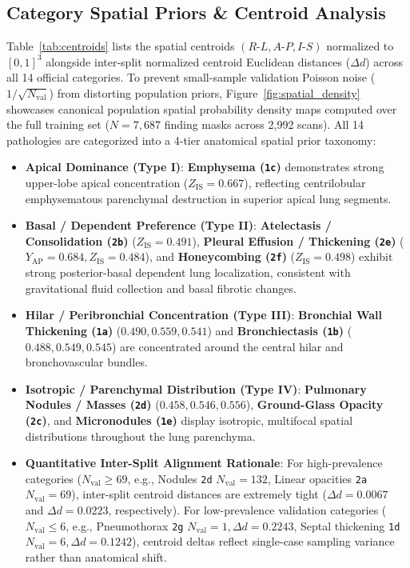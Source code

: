 \documentclass[11pt,a4paper]{article}
\begin{document}
\subsection{Category Spatial Priors \& Centroid Analysis}
Table~\ref{tab:centroids} lists the spatial centroids $(R\text{-}L, A\text{-}P, I\text{-}S)$ normalized to $[0, 1]^3$ alongside inter-split normalized centroid Euclidean distances ($\Delta d$) across all 14 official categories. To prevent small-sample validation Poisson noise ($1/\sqrt{N_{\text{val}}}$) from distorting population priors, Figure~\ref{fig:spatial_density} showcases canonical population spatial probability density maps computed over the full training set ($N=7,687$ finding masks across 2,992 scans). All 14 pathologies are categorized into a 4-tier anatomical spatial prior taxonomy:
\begin{itemize}
    \item \textbf{Apical Dominance (Type I)}: \textbf{Emphysema (\texttt{1c})} demonstrates strong upper-lobe apical concentration ($Z_{\text{IS}} = 0.667$), reflecting centrilobular emphysematous parenchymal destruction in superior apical lung segments.
    \item \textbf{Basal / Dependent Preference (Type II)}: \textbf{Atelectasis / Consolidation (\texttt{2b})} ($Z_{\text{IS}} = 0.491$), \textbf{Pleural Effusion / Thickening (\texttt{2e})} ($Y_{\text{AP}} = 0.684, Z_{\text{IS}} = 0.484$), and \textbf{Honeycombing (\texttt{2f})} ($Z_{\text{IS}} = 0.498$) exhibit strong posterior-basal dependent lung localization, consistent with gravitational fluid collection and basal fibrotic changes.
    \item \textbf{Hilar / Peribronchial Concentration (Type III)}: \textbf{Bronchial Wall Thickening (\texttt{1a})} ($0.490, 0.559, 0.541$) and \textbf{Bronchiectasis (\texttt{1b})} ($0.488, 0.549, 0.545$) are concentrated around the central hilar and bronchovascular bundles.
    \item \textbf{Isotropic / Parenchymal Distribution (Type IV)}: \textbf{Pulmonary Nodules / Masses (\texttt{2d})} ($0.458, 0.546, 0.556$), \textbf{Ground-Glass Opacity (\texttt{2c})}, and \textbf{Micronodules (\texttt{1e})} display isotropic, multifocal spatial distributions throughout the lung parenchyma.
    \item \textbf{Quantitative Inter-Split Alignment Rationale}: For high-prevalence categories ($N_{\text{val}} \ge 69$, e.g., Nodules \texttt{2d} $N_{\text{val}}=132$, Linear opacities \texttt{2a} $N_{\text{val}}=69$), inter-split centroid distances are extremely tight ($\Delta d = 0.0067$ and $\Delta d = 0.0223$, respectively). For low-prevalence validation categories ($N_{\text{val}} \le 6$, e.g., Pneumothorax \texttt{2g} $N_{\text{val}}=1, \Delta d = 0.2243$, Septal thickening \texttt{1d} $N_{\text{val}}=6, \Delta d = 0.1242$), centroid deltas reflect single-case sampling variance rather than anatomical shift.
\end{itemize}
\end{document}
